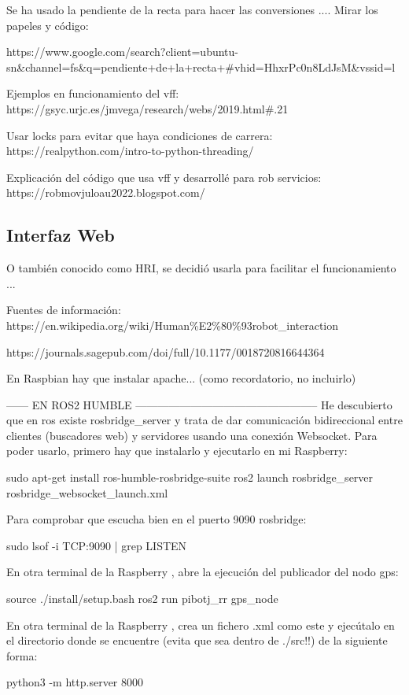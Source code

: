 Se ha usado la pendiente de la recta para hacer las conversiones .... Mirar los papeles y código: 

https://www.google.com/search?client=ubuntu-sn\&channel=fs\&q=pendiente+de+la+recta+\#vhid=HhxrPc0n8LdJsM\&vssid=l

Ejemplos en funcionamiento del vff:
https://gsyc.urjc.es/jmvega/research/webs/2019.html\#.21


Usar locks para evitar que haya condiciones de carrera: https://realpython.com/intro-to-python-threading/


Explicación del código que usa vff y desarrollé para rob servicios: https://robmovjuloau2022.blogspot.com/

\subsection{Interfaz Web}
\label{subsec:softwareweb}

O también conocido como HRI, se decidió usarla para facilitar el funcionamiento ...

Fuentes de información: 
https://en.wikipedia.org/wiki/Human\%E2\%80\%93robot\_interaction

https://journals.sagepub.com/doi/full/10.1177/0018720816644364


En Raspbian  hay que instalar apache... (como recordatorio, no incluirlo)


------ EN ROS2 HUMBLE --------------------------------------------------
He descubierto que en ros existe rosbridge\_server y trata de dar comunicación bidireccional entre clientes (buscadores web) y servidores usando una conexión Websocket. Para poder usarlo, primero hay que instalarlo y ejecutarlo en mi Raspberry:

sudo apt-get install ros-humble-rosbridge-suite
ros2 launch rosbridge\_server rosbridge\_websocket\_launch.xml

Para comprobar que escucha bien en el puerto 9090 rosbridge:

sudo lsof -i TCP:9090 | grep LISTEN

En otra terminal de la Raspberry , abre la ejecución del publicador del nodo gps:

source ./install/setup.bash
ros2 run pibotj\_rr gps\_node

En otra terminal de la Raspberry , crea un fichero .xml como este y ejecútalo en el directorio donde se encuentre (evita que sea dentro de ./src!!) de la siguiente forma:

python3 -m http.server 8000

